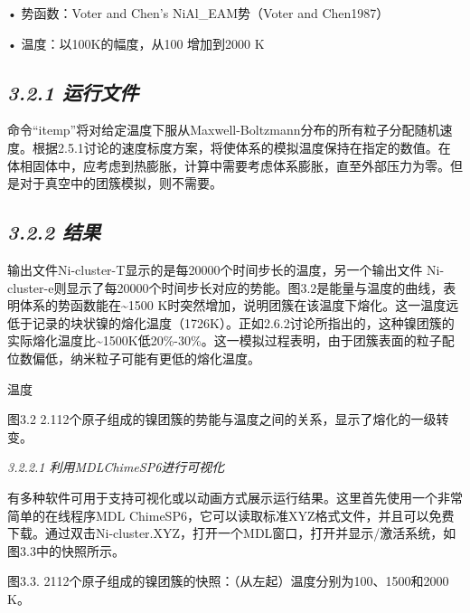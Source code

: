 • 势函数：Voter and Chen's NiAl\_EAM势（Voter and Chen1987）

• 温度：以100K的幅度，从100 增加到2000 K

\hypertarget{ux8fd0ux884cux6587ux4ef6}{%
\subsection{\texorpdfstring{\emph{3.2.1
运行文件}}{3.2.1 运行文件}}\label{ux8fd0ux884cux6587ux4ef6}}



命令``itemp''将对给定温度下服从Maxwell-Boltzmann分布的所有粒子分配随机速度。根据2.5.1讨论的速度标度方案，将使体系的模拟温度保持在指定的数值。在体相固体中，应考虑到热膨胀，计算中需要考虑体系膨胀，直至外部压力为零。但是对于真空中的团簇模拟，则不需要。

\hypertarget{ux7ed3ux679c-1}{%
\subsection{\texorpdfstring{\emph{3.2.2
结果}}{3.2.2 结果}}\label{ux7ed3ux679c-1}}

输出文件Ni-cluster-T显示的是每20000个时间步长的温度，另一个输出文件
Ni-cluster-e则显示了每20000个时间步长对应的势能。图3.2是能量与温度的曲线，表明体系的势函数能在\textasciitilde1500
K时突然增加，说明团簇在该温度下熔化。这一温度远低于记录的块状镍的熔化温度（1726K）。正如2.6.2讨论所指出的，这种镍团簇的实际熔化温度比\textasciitilde1500K低20\%-30\%。这一模拟过程表明，由于团簇表面的粒子配位数偏低，纳米粒子可能有更低的熔化温度。


温度

图3.2
2.112个原子组成的镍团簇的势能与温度之间的关系，显示了熔化的一级转变。

\emph{3.2.2.1 利用MDLChimeSP6进行可视化}

有多种软件可用于支持可视化或以动画方式展示运行结果。这里首先使用一个非常简单的在线程序MDL
ChimeSP6，它可以读取标准XYZ格式文件，并且可以免费下载。通过双击Ni-cluster.XYZ，打开一个MDL窗口，打开并显示/激活系统，如图3.3中的快照所示。


图3.3. 2112个原子组成的镍团簇的快照：（从左起）温度分别为100、1500和2000
K。

